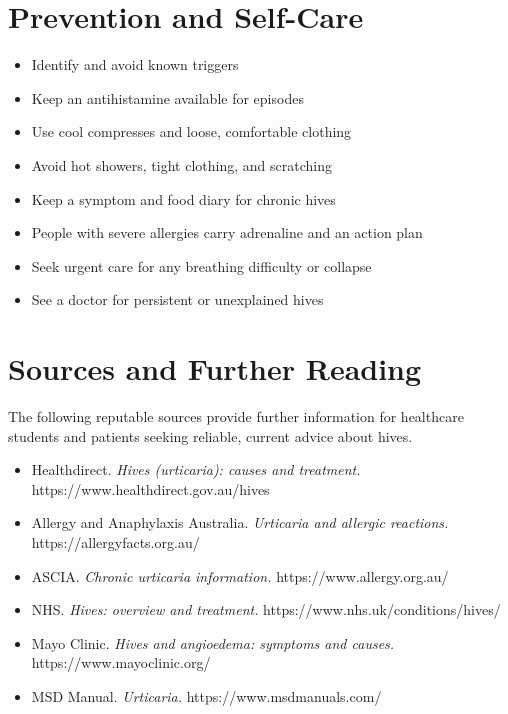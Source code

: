 \section*{Prevention and Self-Care}
\begin{itemize}
    \item Identify and avoid known triggers
    \item Keep an antihistamine available for episodes
    \item Use cool compresses and loose, comfortable clothing
    \item Avoid hot showers, tight clothing, and scratching
    \item Keep a symptom and food diary for chronic hives
    \item People with severe allergies carry adrenaline and an action plan
    \item Seek urgent care for any breathing difficulty or collapse
    \item See a doctor for persistent or unexplained hives
\end{itemize}

\section*{Sources and Further Reading}
The following reputable sources provide further information for healthcare students and patients seeking reliable, current advice about hives.

\begin{itemize}
    \item Healthdirect. \textit{Hives (urticaria): causes and treatment.} https://www.healthdirect.gov.au/hives
    \item Allergy and Anaphylaxis Australia. \textit{Urticaria and allergic reactions.} https://allergyfacts.org.au/
    \item ASCIA. \textit{Chronic urticaria information.} https://www.allergy.org.au/
    \item NHS. \textit{Hives: overview and treatment.} https://www.nhs.uk/conditions/hives/
    \item Mayo Clinic. \textit{Hives and angioedema: symptoms and causes.} https://www.mayoclinic.org/
    \item MSD Manual. \textit{Urticaria.} https://www.msdmanuals.com/
\end{itemize}

